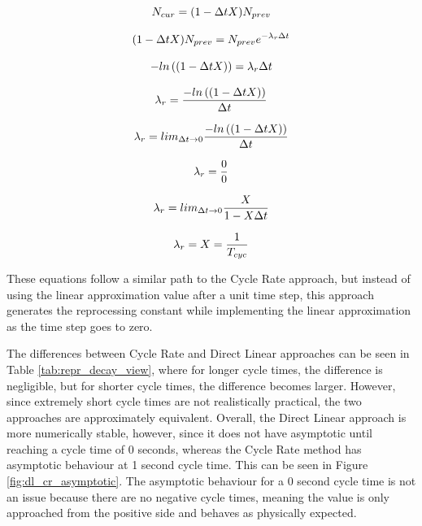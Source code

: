 \begin{equation} \hfill
N_{cur} = (1 - \Delta t X) N_{prev}
\hfill\label{eq:dir_lin_3} \end{equation}

\begin{equation} \hfill
(1 - \Delta t X) N_{prev} = N_{prev} e^{-\lambda_r \Delta t}
\hfill\label{eq:dir_lin_4} \end{equation}

\begin{equation} \hfill
-ln\left((1 - \Delta t X)\right) = \lambda_r \Delta t
\hfill\label{eq:dir_lin_5} \end{equation}

\begin{equation} \hfill
\lambda_r = \frac{-ln\left((1 - \Delta t X)\right)}{\Delta t}
\hfill\label{eq:dir_lin_6} \end{equation}

\begin{equation} \hfill
\lambda_r = lim_{\Delta t \to 0} \frac{-ln\left((1 - \Delta t X)\right)}{\Delta t}
\hfill\label{eq:dir_lin_7} \end{equation}

\begin{equation} \hfill
\lambda_r = \frac{0}{0}
\hfill\label{eq:dir_lin_8} \end{equation}

\begin{equation} \hfill
\lambda_r = lim_{\Delta t \to 0} \frac{X}{1-X\Delta t}
\hfill\label{eq:dir_lin_9} \end{equation}

\begin{equation} \hfill
\lambda_r = X = \frac{1}{T_{cyc}}
\hfill\label{eq:dir_lin_10} \end{equation}

These equations follow a similar path to the Cycle Rate approach, but instead of using the linear approximation value after a unit time step, this approach generates the reprocessing constant while implementing the linear approximation as the time step goes to zero.

The differences between Cycle Rate and Direct Linear approaches can be seen in Table \ref{tab:repr_decay_view}, where for longer cycle times, the difference is negligible, but for shorter cycle times, the difference becomes larger. However, since extremely short cycle times are not realistically practical, the two approaches are approximately equivalent. Overall, the Direct Linear approach is more numerically stable, however, since it does not have asymptotic until reaching a cycle time of 0 seconds, whereas the Cycle Rate method has asymptotic behaviour at 1 second cycle time. This can be seen in Figure \ref{fig:dl_cr_asymptotic}. The asymptotic behaviour for a 0 second cycle time is not an issue because there are no negative cycle times, meaning the value is only approached from the positive side and behaves as physically expected.

